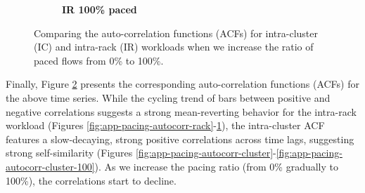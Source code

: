 \begin{figure}[t]
\begin{subfigure}[t]{.24\linewidth}
		\vspace{-6mm}
		\caption{\textbf{IR 100\% paced}}
		\label{fig:app-pacing-autocorr-rack-100}
	\end{subfigure}
\vspace{-2mm}
	\caption{\small{
 Comparing the auto-correlation functions (ACFs) for intra-cluster (IC) and intra-rack (IR) workloads when we increase the ratio of paced flows from 0\% to 100\%. }}
		\label{fig:app-pacing}
\vspace{-2mm}
\end{figure}
\thispagestyle{empty}


Finally, Figure \ref{fig:app-pacing} presents the corresponding auto-correlation functions (ACFs) for the above time series. While the cycling trend of bars between positive and negative correlations suggests a strong mean-reverting behavior for the intra-rack workload (Figures \ref{fig:app-pacing-autocorr-rack}-\ref{fig:app-pacing-autocorr-rack-100}), the intra-cluster ACF features a slow-decaying, strong positive correlations across time lags, suggesting strong self-similarity (Figures \ref{fig:app-pacing-autocorr-cluster}-\ref{fig:app-pacing-autocorr-cluster-100}). As we increase the pacing ratio (from 0\% gradually to 100\%), the correlations start to decline.

\thispagestyle{empty}

